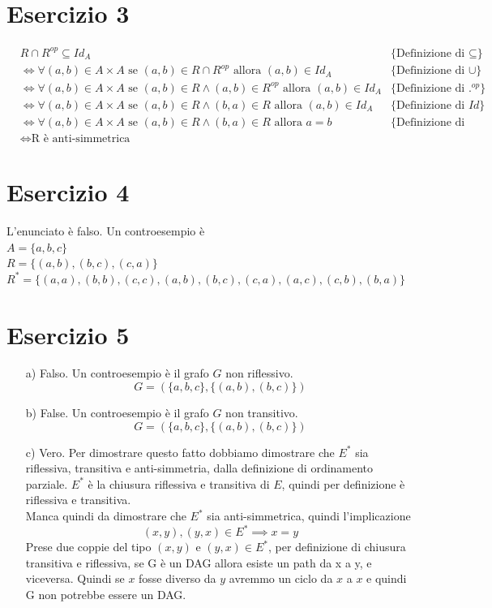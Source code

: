 \documentclass{article}
\begin{document}
\section{Esercizio 3}
\begin{align*}
     & R \cap R^{op} \subseteq Id_A                                                                                    & \text{\{Definizione di \(\subseteq\)\}} \\
     & \iff \forall (a,b) \in A \times A \text{ se } (a,b) \in R \cap R^{op} \text{ allora } (a,b) \in Id_A            & \text{\{Definizione di \(\cup\)\}}      \\
     & \iff \forall (a,b) \in A \times A \text{ se } (a,b) \in R \land (a,b) \in R^{op} \text{ allora } (a,b) \in Id_A & \text{\{Definizione di \(.^{op}\)\}}    \\
     & \iff \forall (a,b) \in A \times A \text{ se } (a,b) \in R \land (b,a) \in R \text{ allora } (a,b) \in Id_A      & \text{\{Definizione di \(Id\)\}}        \\
     & \iff \forall (a,b) \in A \times A \text{ se } (a,b) \in R \land (b,a) \in R \text{ allora } a = b               & \text{\{Definizione di anti-simm.\}}    \\
     & \iff \text{R è anti-simmetrica}
\end{align*}

\section{Esercizio 4}
L'enunciato è falso. Un controesempio è \\
\(A = \{a,b,c\}\)\\
\(R = \{(a,b), (b,c), (c,a)\}\)\\
\(R^* = \{(a,a), (b,b), (c,c), (a,b), (b,c), (c,a), (a,c), (c,b), (b,a)\}\)
\section{Esercizio 5}
\begin{enumerate}
    \item[a)] Falso. Un controesempio è il grafo \(G\) non riflessivo. \[G = (\{a,b,c\}, \{(a,b), (b,c)\})\]
    \item[b)] False. Un controesempio è il grafo \(G\) non transitivo. \[G = (\{a,b,c\}, \{(a,b), (b,c)\})\]
    \item[c)] Vero.
        Per dimostrare questo fatto dobbiamo dimostrare che \(E^*\) sia riflessiva, transitiva e anti-simmetria, dalla definizione di ordinamento parziale.
        \(E^*\) è la chiusura riflessiva e transitiva di \(E\), quindi per definizione è riflessiva e transitiva. \\
        Manca quindi da dimostrare che \(E^*\) sia anti-simmetrica, quindi l'implicazione
        \[(x,y), (y,x) \in E^* \implies x = y\]
        Prese due coppie del tipo \((x,y)\) e \((y,x) \in E^*\), per definizione di chiusura transitiva e riflessiva, se G è un DAG allora esiste un path da x a y, e viceversa.
        Quindi se \(x\) fosse diverso da \(y\) avremmo un ciclo da \(x\) a \(x\) e quindi G non potrebbe essere un DAG.

\end{enumerate}
\end{document}
